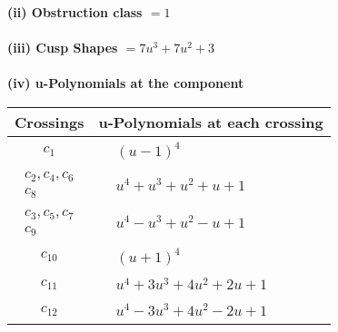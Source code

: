 \documentclass[1p]{elsarticle_modified}
\theoremstyle{definition}
\begin{document}
\flushleft \textbf{(ii) Obstruction class $= 1$}\\~\\
\flushleft \textbf{(iii) Cusp Shapes $= 7 u^3+7 u^2+3$}\\~\\
\newpage\renewcommand{\arraystretch}{1}
\flushleft \textbf{(iv) u-Polynomials at the component}\newline \\
\begin{tabular}{m{50pt}|m{274pt}}
Crossings & \hspace{64pt}u-Polynomials at each crossing \\
\hline $$\begin{aligned}c_{1}\end{aligned}$$&$\begin{aligned}
&(u-1)^4
\end{aligned}$\\
\hline $$\begin{aligned}c_{2},c_{4},c_{6}\\c_{8}\end{aligned}$$&$\begin{aligned}
&u^4+u^3+u^2+u+1
\end{aligned}$\\
\hline $$\begin{aligned}c_{3},c_{5},c_{7}\\c_{9}\end{aligned}$$&$\begin{aligned}
&u^4- u^3+u^2- u+1
\end{aligned}$\\
\hline $$\begin{aligned}c_{10}\end{aligned}$$&$\begin{aligned}
&(u+1)^4
\end{aligned}$\\
\hline $$\begin{aligned}c_{11}\end{aligned}$$&$\begin{aligned}
&u^4+3 u^3+4 u^2+2 u+1
\end{aligned}$\\
\hline $$\begin{aligned}c_{12}\end{aligned}$$&$\begin{aligned}
&u^4-3 u^3+4 u^2-2 u+1
\end{aligned}$\\
\hline
\end{tabular}\\~\\
\end{document}
